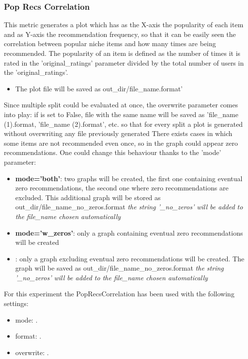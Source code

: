 \documentclass[11pt]{article}
\begin{document}
\subsubsection{Pop Recs Correlation}\label{sec:popRC}
This metric generates a plot which has as the X-axis the popularity of each item and as Y-axis the recommendation
frequency, so that it can be easily seen the correlation between popular niche items and how many times are being
recommended.
The popularity of an item is defined as the number of times it is rated in the 'original_ratings' parameter
divided by the total number of users in the 'original_ratings'.
\begin{itemize}
    \item The plot file will be saved as out_dir/file_name.format'
\end{itemize}
\hfill\break
\hfill\break
Since multiple split could be evaluated at once, the overwrite parameter comes into play:
if is set to False, file with the same name will be saved as 'file_name (1).format, 'file_name (2).format', etc.
so that for every split a plot is generated without overwriting any file previously generated
\hfill\break
\hfill\break
There exists cases in which some items are not recommended even once, so in the graph could appear
zero recommendations. One could change this behaviour thanks to the 'mode' parameter:
\begin{itemize}
    \item \textbf{mode='both'}: two graphs will be created, the first one containing eventual zero recommendations, the
      second one where zero recommendations are excluded. This additional graph will be stored as
      out_dir/file_name_no_zeros.format \textit{the string '_no_zeros' will be added to the file_name chosen automatically}
    \item \textbf{mode='w_zeros'}: only a graph containing eventual zero recommendations will be created
    \item {}: only a graph excluding eventual zero recommendations will be created. The graph will be
      saved as out_dir/file_name_no_zeros.format \textit{the string '_no_zeros' will be added to the file_name chosen automatically}
\end{itemize}
\hfill\break
\hfill\break
For this experiment the PopRecsCorrelation has been used with the following settings:
\begin{itemize}
    \item mode: .
    \item format: .
    \item overwrite: .
\end{itemize}
\hfill\break
\hfill\break
\end{document}
